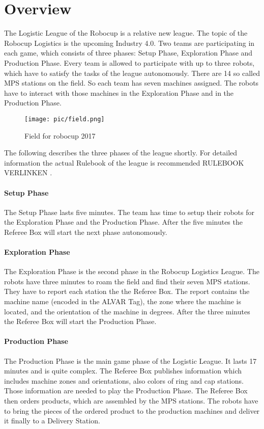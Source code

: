 \section{Overview}

The Logistic League of the Robocup is a relative new league. The topic of the Robocup Logistics is the upcoming Industry 4.0. Two teams are participating in each game, which consists of three phases: Setup Phase, Exploration Phase and Production Phase. Every team is allowed to participate with up to three robots, which have to satisfy the tasks of the league autonomously. There are 14 so called MPS stations on the field. So each team has seven machines assigned. The robots have to interact with those machines in the Exploration Phase and in the Production Phase.

\begin{figure}%
\centering
\texttt{[image: pic/field.png]}
\caption{Field for robocup 2017}
\label{fig:frog}
\end{figure}

The following describes the three phases of the league shortly. For detailed information the actual Rulebook of the league is recommended RULEBOOK VERLINKEN .

\paragraph{Setup Phase}
The Setup Phase lasts five minutes. The team has time to setup their robots for the Exploration Phase and the Production Phase. After the five minutes the Referee Box will start the next phase autonomously.

\paragraph{Exploration Phase}
The Exploration Phase is the second phase in the Robocup Logistics League. The robots have three minutes to roam the field and find their seven MPS stations. They have to report each station the the Referee Box. The report contains the machine name (encoded in the ALVAR Tag), the zone where the machine is located, and the orientation of the machine in degrees. After the three minutes the Referee Box will start the Production Phase.

\paragraph{Production Phase}
The Production Phase is the main game phase of the Logistic League. It lasts 17 minutes and is quite complex. The Referee Box publishes information which includes machine zones and orientations, also colors of ring and cap stations. Those information are needed to play the Production Phase. The Referee Box then orders products, which are assembled by the MPS stations. The robots have to bring the pieces of the ordered product to the production machines and deliver it finally to a Delivery Station. 


